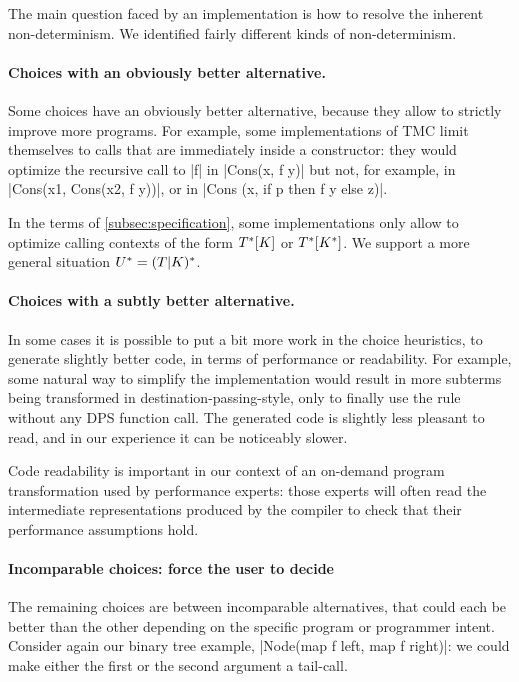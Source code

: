 The main question faced by an implementation is how to resolve the
inherent non-determinism. We identified fairly different kinds of
non-determinism.

\paragraph{Choices with an obviously better alternative.} Some choices have an obviously better alternative, because they allow to strictly improve more programs. For example, some implementations of TMC limit themselves to calls that are immediately inside a constructor: they would optimize the recursive call to \ocaml|f| in \ocaml|Cons(x, f y)| but not, for example, in \ocaml|Cons(x1, Cons(x2, f y))|, or in \ocaml|Cons (x, if p then f y else z)|.

In the terms of \cref{subsec:specification}, some implementations only allow to optimize calling contexts of the form $\datalangTailCtx{[\datalangConsFrame]}$ or $\datalangTailCtx{[\datalangConsCtx]}$. We support a more general situation $\datalangTMCCtx = (\datalangTailFrame | \datalangConsFrame)^{*}$.

\paragraph{Choices with a subtly better alternative.} In some cases it
is possible to put a bit more work in the choice heuristics, to
generate slightly better code, in terms of performance or
readability. For example, some natural way to simplify the
implementation would result in more subterms being transformed in
destination-passing-style, only to finally use the
 rule without any DPS function call. The generated
code is slightly less pleasant to read, and in our experience it can
be noticeably slower.

Code readability is important in our context of an on-demand program
transformation used by performance experts: those experts will often
read the intermediate representations produced by the compiler to
check that their performance assumptions hold.

\paragraph{Incomparable choices: force the user to decide} The
remaining choices are between incomparable alternatives, that could
each be better than the other depending on the specific program or
programmer intent. Consider again our binary tree example,
\ocaml|Node(map f left, map f right)|: we could make either the first
or the second argument a tail-call.


